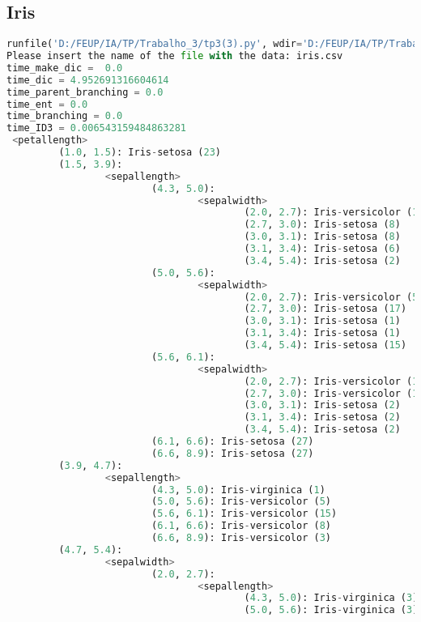 \documentclass{article}
\begin{document}
\subsection{Iris}
\begin{lstlisting}[language = Python]
runfile('D:/FEUP/IA/TP/Trabalho_3/tp3(3).py', wdir='D:/FEUP/IA/TP/Trabalho_3')
Please insert the name of the file with the data: iris.csv
time_make_dic =  0.0
time_dic = 4.952691316604614
time_parent_branching = 0.0
time_ent = 0.0
time_branching = 0.0
time_ID3 = 0.006543159484863281
 <petallength>
         (1.0, 1.5): Iris-setosa (23)
         (1.5, 3.9):
                 <sepallength>
                         (4.3, 5.0):
                                 <sepalwidth>
                                         (2.0, 2.7): Iris-versicolor (1)
                                         (2.7, 3.0): Iris-setosa (8)
                                         (3.0, 3.1): Iris-setosa (8)
                                         (3.1, 3.4): Iris-setosa (6)
                                         (3.4, 5.4): Iris-setosa (2)
                         (5.0, 5.6):
                                 <sepalwidth>
                                         (2.0, 2.7): Iris-versicolor (5)
                                         (2.7, 3.0): Iris-setosa (17)
                                         (3.0, 3.1): Iris-setosa (1)
                                         (3.1, 3.4): Iris-setosa (1)
                                         (3.4, 5.4): Iris-setosa (15)
                         (5.6, 6.1):
                                 <sepalwidth>
                                         (2.0, 2.7): Iris-versicolor (1)
                                         (2.7, 3.0): Iris-versicolor (1)
                                         (3.0, 3.1): Iris-setosa (2)
                                         (3.1, 3.4): Iris-setosa (2)
                                         (3.4, 5.4): Iris-setosa (2)
                         (6.1, 6.6): Iris-setosa (27)
                         (6.6, 8.9): Iris-setosa (27)
         (3.9, 4.7):
                 <sepallength>
                         (4.3, 5.0): Iris-virginica (1)
                         (5.0, 5.6): Iris-versicolor (5)
                         (5.6, 6.1): Iris-versicolor (15)
                         (6.1, 6.6): Iris-versicolor (8)
                         (6.6, 8.9): Iris-versicolor (3)
         (4.7, 5.4):
                 <sepalwidth>
                         (2.0, 2.7):
                                 <sepallength>
                                         (4.3, 5.0): Iris-virginica (3)
                                         (5.0, 5.6): Iris-virginica (3)

\end{lstlisting}
\end{document}
